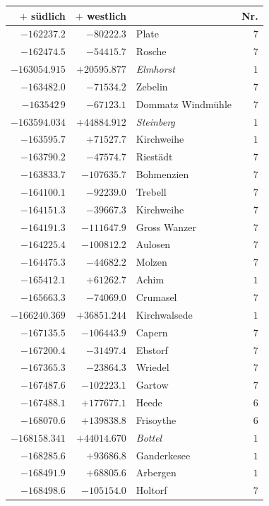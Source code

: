 \clearpage{}%
\begin{center}\begingroup\fontsize{8}{9}\selectfont
\setlength{\tabcolsep}{4pt}
\begin{tabular}{r|r|p{170pt}|r}\hline
\(+\) südlich&\(+\) westlich&&Nr.\\\hline
\(-162237.2\)&\(-80222.3\)&Plate&\(7\)\\
\(-162474.5\)&\(-54415.7\)&Rosche&\(7\)\\
\(-163054.915\)&\(+20595.877\)&\textit{Elmhorst}&\(1\)\\
\(-163482.0\)&\(-71534.2\)&Zebelin&\(7\)\\
\(-163542\,9\)&\(-67123.1\)&Dommatz Windmühle&\(7\)\\
\(-163594.034\)&\(+44884.912\)&\textit{Steinberg}&\(1\)\\
\(-163595.7\)&\(+71527.7\)&Kirchweihe&\(1\)\\
\(-163790.2\)&\(-47574.7\)&Riestädt&\(7\)\\
\(-163833.7\)&\(-107635.7\)&Bohmenzien&\(7\)\\
\(-164100.1\)&\(-92239.0\)&Trebell&\(7\)\\
\(-164151.3\)&\(-39667.3\)&Kirchweihe&\(7\)\\
\(-164191.3\)&\(-111647.9\)&Gross Wanzer&\(7\)\\
\(-164225.4\)&\(-100812.2\)&Aulosen&\(7\)\\
\(-164475.3\)&\(-44682.2\)&Molzen&\(7\)\\
\(-165412.1\)&\(+61262.7\)&Achim&\(1\)\\
\(-165663.3\)&\(-74069.0\)&Crumasel&\(7\)\\
\(-166240.369\)&\(+36851.244\)&Kirchwalsede&\(1\)\\
\(-167135.5\)&\(-106443.9\)&Capern&\(7\)\\
\(-167200.4\)&\(-31497.4\)&Ebstorf&\(7\)\\
\(-167365.3\)&\(-23864.3\)&Wriedel&\(7\)\\
\(-167487.6\)&\(-102223.1\)&Gartow&\(7\)\\
\(-167488.1\)&\(+177677.1\)&Heede&\(6\)\\
\(-168070.6\)&\(+139838.8\)&Frisoythe&\(6\)\\
\(-168158.341\)&\(+44014.670\)&\textit{Bottel}&\(1\)\\
\(-168285.6\)&\(+93686.8\)&Ganderkesee&\(1\)\\
\(-168491.9\)&\(+68805.6\)&Arbergen&\(1\)\\
\(-168498.6\)&\(-105154.0\)&Holtorf&\(7\)\\

\end{tabular}
\end{center}

